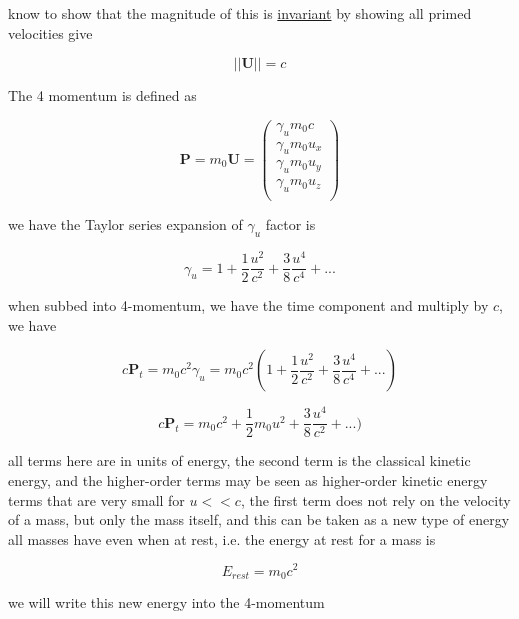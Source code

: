 know to show that the magnitude of this is \hyperlink{def-lorentz-invariant}{invariant} by showing all primed velocities give

\begin{equation}
	||\mathbf{U}|| = c
\end{equation}

The 4 momentum is defined as

\begin{equation}
	\mathbf{P} = m_0 \mathbf{U} =
	\begin{pmatrix}
		\gamma_u m_0 c   \\
		\gamma_u m_0 u_x \\
		\gamma_u m_0 u_y \\
		\gamma_u m_0 u_z \\
	\end{pmatrix}
\end{equation}

we have the Taylor series expansion of $\gamma_u$ factor is

\begin{equation}
	\gamma_u = 1 + \frac{1}{2}\frac{u^2}{c^2} + \frac{3}{8}\frac{u^4}{c^4} + ...
\end{equation}

when subbed into 4-momentum, we have the time component and multiply by $c$, we have

\begin{equation}
	c \mathbf{P}_t = m_0 c^2\gamma_u = m_0 c^2 ( 1 + \frac{1}{2}\frac{u^2}{c^2} +\frac{3}{8}\frac{u^4}{c^4} + ... )
\end{equation}

\begin{equation}
	c \mathbf{P}_t = m_0 c^2  + \frac{1}{2} m_0 u^2  + \frac{3}{8}\frac{u^4}{c^2} + ... )
\end{equation}

all terms here are in units of energy, the second term is the classical kinetic energy, and the higher-order terms may be seen as higher-order kinetic energy terms that are very small for $u<<c$, the first term does not rely on the velocity of a mass, but only the mass itself, and this can be taken as a new type of energy all masses have even when at rest, i.e. the energy at rest for a mass is

\begin{equation}
	E_{rest} = m_0 c^2
\end{equation}

we will write this new energy into the 4-momentum

